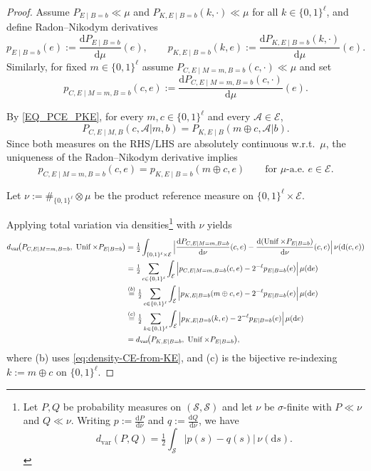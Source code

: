 \documentclass[onecolumn]{IEEEtran} %
\newcommand{\1}{\mathbbm{1}}
\theoremstyle{boldremark}
\DeclareMathOperator{\Unif}{Unif}
\begin{document}
\begin{proof}
Assume $P_{E\mid B=b}\ll\mu$ and $P_{K,E\mid B=b}(k,\cdot)\ll\mu$ for all $k\in\{0,1\}^{\ell}$, and define Radon--Nikodym derivatives 
\[
p_{E\mid B=b}(e):=\frac{\mathrm d P_{E\mid B=b}}{\mathrm d \mu}(e),
\qquad
p_{K,E\mid B=b}(k,e):=\frac{\mathrm d P_{K,E\mid B=b}(k,\cdot)}{\mathrm d \mu}(e).
\]
Similarly, for fixed $m\in\{0,1\}^{\ell}$ assume $P_{C,E\mid M=m,B=b}(c,\cdot)\ll\mu$ and set
\[
p_{C,E\mid M=m,B=b}(c,e):=\frac{\mathrm d P_{C,E\mid M=m,B=b}(c,\cdot)}{\mathrm d \mu}(e).
\]

By \eqref{EQ_PCE_PKE}, for every $m,c\in\{0,1\}^{\ell}$ and every $\mathcal{A}\in\mathscr{E}$,
\begin{equation}\label{eq:PCE-setwise}
P_{C,E\mid M,B}(c,\mathcal{A}|m,b)
=
P_{K,E\mid B}(m\oplus c,\mathcal{A}|b).
\end{equation}
Since both measures on the RHS/LHS are absolutely continuous w.r.t.\ $\mu$, the uniqueness of the
Radon--Nikodym derivative implies
\begin{equation}\label{eq:density-CE-from-KE}
p_{C,E\mid M=m,B=b}(c,e)=p_{K,E\mid B=b}(m\oplus c,e)
\qquad \text{for }\mu\text{-a.e.\ }e\in\mathcal{E}.
\end{equation}


Let $\nu:=\#_{\{0,1\}^{\ell}}\otimes \mu$ be the product reference measure on $\{0,1\}^{\ell}\times\mathcal{E}$.

Applying total variation via densities\footnote{Let $P,Q$ be probability measures on $(\mathcal{S},\mathscr{S})$ and let $\nu$ be $\sigma$-finite with
$P\ll\nu$ and $Q\ll\nu$. Writing $p:=\frac{\mathrm dP}{\mathrm d\nu}$ and $q:=\frac{\mathrm dQ}{\mathrm d\nu}$, we have
\[
d_{\mathrm{var}}(P,Q)=\tfrac12\int_{\mathcal{S}} |p(s)-q(s)|\,\nu(\mathrm d s).
\]} with $\nu$ yields
\begin{align}
d_{\mathrm{var}}\!\big(P_{C,E\mid M=m,B=b},\ \Unif\times P_{E\mid B=b}\big)
&=\tfrac12\int_{\{0,1\}^{\ell}\times\mathcal{E}}
\Big|
\frac{\mathrm d P_{C,E\mid M=m,B=b}}{\mathrm d\nu}(c,e)
-
\frac{\mathrm d(\Unif\times P_{E\mid B=b})}{\mathrm d\nu}(c,e)
\Big|\,\nu(\mathrm d(c,e))\notag\\
&=\tfrac12\sum_{c\in\{0,1\}^{\ell}}\int_{\mathcal{E}}
\Big|p_{C,E\mid M=m,B=b}(c,e)-2^{-\ell}p_{E\mid B=b}(e)\Big|\,\mu(\mathrm d e)\notag\\
&\overset{(b)}{=}\tfrac12\sum_{c\in\{0,1\}^{\ell}}\int_{\mathcal{E}}
\Big|p_{K,E\mid B=b}(m\oplus c,e)-2^{-\ell}p_{E\mid B=b}(e)\Big|\,\mu(\mathrm d e)\notag\\
&\overset{(c)}{=}\tfrac12\sum_{k\in\{0,1\}^{\ell}}\int_{\mathcal{E}}
\Big|p_{K,E\mid B=b}(k,e)-2^{-\ell}p_{E\mid B=b}(e)\Big|\,\mu(\mathrm d e)\notag\\
&=d_{\mathrm{var}}\!\big(P_{K,E\mid B=b},\ \Unif\times P_{E\mid B=b}\big),
\label{eq:tv_CE_eq_tv_KE_mu}
\end{align}
where (b) uses \eqref{eq:density-CE-from-KE}, and (c) is the bijective re-indexing $k:=m\oplus c$
on $\{0,1\}^{\ell}$.


\end{proof}
\end{document}
